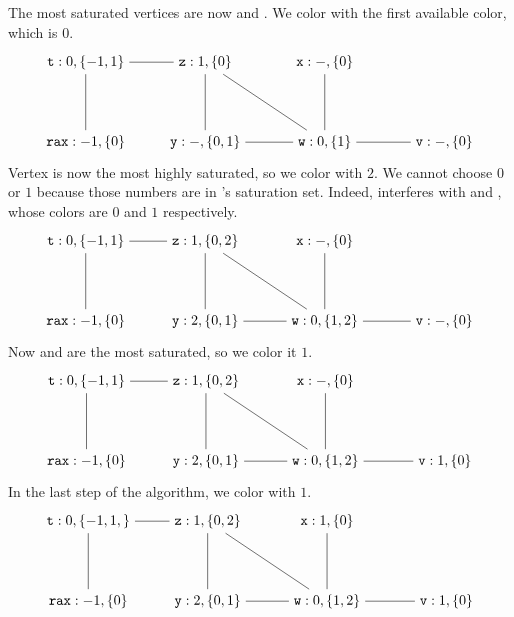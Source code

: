 \documentclass[11pt]{book}
\begin{document}
The most saturated vertices are now  and . We color
 with the first available color, which is $0$.
\[
\begin{tikzpicture}[baseline=(current  bounding  box.center)]
\node (rax) at (0,0) {$\ttm{rax}:-1,\{0\}$};
\node (t1) at (0,2) {$\ttm{t}:0,\{-1,1\}$};
\node (z) at (3,2)  {$\ttm{z}:1,\{0\}$};
\node (x) at (6,2)  {$\ttm{x}:-,\{0\}$};
\node (y) at (3,0)  {$\ttm{y}:-,\{0,1\}$};
\node (w) at (6,0)  {$\ttm{w}:0,\{1\}$};
\node (v) at (9,0)  {$\ttm{v}:-,\{0\}$};

\draw (t1) to (rax);
\draw (t1) to (z);
\draw (z) to (y);
\draw (z) to (w);
\draw (x) to (w);
\draw (y) to (w);
\draw (v) to (w);
\end{tikzpicture}
\]
Vertex  is now the most highly saturated, so we color 
with $2$.  We cannot choose $0$ or $1$ because those numbers are in
's saturation set. Indeed,  interferes with 
and , whose colors are $0$ and $1$ respectively.
\[
\begin{tikzpicture}[baseline=(current  bounding  box.center)]
\node (rax) at (0,0) {$\ttm{rax}:-1,\{0\}$};
\node (t1) at (0,2) {$\ttm{t}:0,\{-1,1\}$};
\node (z) at (3,2)  {$\ttm{z}:1,\{0,2\}$};
\node (x) at (6,2)  {$\ttm{x}:-,\{0\}$};
\node (y) at (3,0)  {$\ttm{y}:2,\{0,1\}$};
\node (w) at (6,0)  {$\ttm{w}:0,\{1,2\}$};
\node (v) at (9,0)  {$\ttm{v}:-,\{0\}$};

\draw (t1) to (rax);
\draw (t1) to (z);
\draw (z) to (y);
\draw (z) to (w);
\draw (x) to (w);
\draw (y) to (w);
\draw (v) to (w);
\end{tikzpicture}
\]
Now  and  are the most saturated, so we color  it $1$.
\[
\begin{tikzpicture}[baseline=(current  bounding  box.center)]
\node (rax) at (0,0) {$\ttm{rax}:-1,\{0\}$};
\node (t1) at (0,2) {$\ttm{t}:0,\{-1,1\}$};
\node (z) at (3,2)  {$\ttm{z}:1,\{0,2\}$};
\node (x) at (6,2)  {$\ttm{x}:-,\{0\}$};
\node (y) at (3,0)  {$\ttm{y}:2,\{0,1\}$};
\node (w) at (6,0)  {$\ttm{w}:0,\{1,2\}$};
\node (v) at (9,0)  {$\ttm{v}:1,\{0\}$};

\draw (t1) to (rax);
\draw (t1) to (z);
\draw (z) to (y);
\draw (z) to (w);
\draw (x) to (w);
\draw (y) to (w);
\draw (v) to (w);
\end{tikzpicture}
\]
In the last step of the algorithm, we color  with $1$.
\[
\begin{tikzpicture}[baseline=(current  bounding  box.center)]
\node (rax) at (0,0) {$\ttm{rax}:-1,\{0\}$};
\node (t1) at (0,2) {$\ttm{t}:0,\{-1,1,\}$};
\node (z) at (3,2)  {$\ttm{z}:1,\{0,2\}$};
\node (x) at (6,2)  {$\ttm{x}:1,\{0\}$};
\node (y) at (3,0)  {$\ttm{y}:2,\{0,1\}$};
\node (w) at (6,0)  {$\ttm{w}:0,\{1,2\}$};
\node (v) at (9,0)  {$\ttm{v}:1,\{0\}$};

\draw (t1) to (rax);
\draw (t1) to (z);
\draw (z) to (y);
\draw (z) to (w);
\draw (x) to (w);
\draw (y) to (w);
\draw (v) to (w);
\end{tikzpicture}
\]
\end{document}
